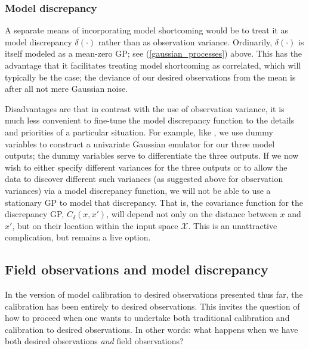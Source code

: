 \documentclass{article}
\begin{document}

\subsubsection{Model discrepancy}\label{mod_disc}

A separate means of incorporating model shortcoming would be to treat it as model discrepancy $\delta(\cdot)$ rather than as observation variance. Ordinarily, $\delta(\cdot)$ is itself modeled as a mean-zero GP; see (\ref{gaussian_processes}) above. This has the advantage that it facilitates treating model shortcoming as correlated, which will typically be the case; the deviance of our desired observations from the mean is after all not mere Gaussian noise.

Disadvantages are that in contrast with the use of observation variance, it is much less convenient to fine-tune the model discrepancy function to the details and priorities of a particular situation. For example, like \cite{Williams2006}, we use dummy variables to construct a univariate Gaussian emulator for our three model outputs; the dummy variables serve to differentiate the three outputs. If we now wish to either specify different variances for the three outputs or to allow the data to discover different such variances (as suggested above for observation variances) via a model discrepancy function, we will not be able to use a stationary GP to model that discrepancy. That is, the covariance function for the discrepancy GP, $C_\delta(x,x')$, will depend not only on the distance between $x$ and $x'$, but on their location within the input space $\mathcal X$. This is an unattractive complication, but remains a live option.

\subsection{Field observations and model discrepancy}

In the version of model calibration to desired observations presented thus far, the calibration has been entirely to desired observations. This invites the question of how to proceed when one wants to undertake both traditional calibration and calibration to desired observations. In other words: what happens when we have both desired observations \emph{and} field observations? 
\end{document}
